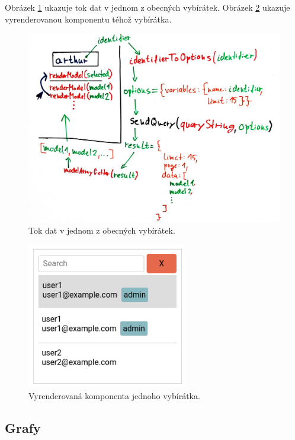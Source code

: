 Obrázek \ref{fig:picker_lifecycle} ukazuje tok dat v jednom z obecných vybírátek.
Obrázek \ref{fig:picker_component} ukazuje vyrenderovanou komponentu téhož vybírátka.

\begin{figure}[!htb] \centering
  \includegraphics[width=145mm]{../img/picker_lifecycle.jpg}
  \caption{Tok dat v jednom z obecných vybírátek.}
  \label{fig:picker_lifecycle}
\end{figure}

\begin{figure}[!htb] \centering
  \includegraphics[width=70mm]{../img/picker_component.png}
  \caption{Vyrenderovaná komponenta jednoho vybírátka.}
  \label{fig:picker_component}
\end{figure}

\newpage
\subsection{Grafy}

